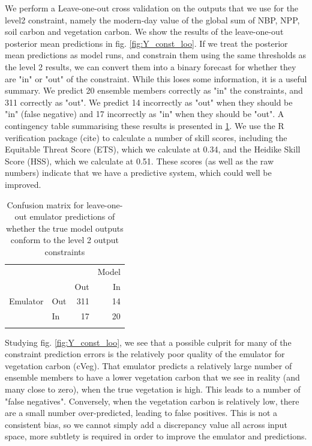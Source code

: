\documentclass[gmd, manuscript]{copernicus}
\begin{document}
We perform a Leave-one-out cross validation on the outputs that we use for the level2 constraint, namely the modern-day value of the global sum of NBP, NPP, soil carbon and vegetation carbon. We show the results of the leave-one-out posterior mean predictions in fig. \ref{fig:Y_const_loo}. If we treat the posterior mean predictions as model runs, and constrain them using the same thresholds as the level 2 results, we can convert them into a binary forecast for whether they are "in" or "out" of the constraint. While this loses some information, it is a useful summary. We predict 20 ensemble members correctly as "in" the constraints, and 311 correctly as "out". We predict 14 incorrectly as "out" when they should be "in" (false negative) and 17 incorrectly as "in" when they should be "out". A contingency table summarising these results is presented in \ref{table:level_2_contingency}. We use the R verification package (cite) to calculate a number of skill scores, including the Equitable Threat Score (ETS), which we calculate at 0.34, and the Heidike Skill Score (HSS), which we calculate at 0.51. These scores (as well as the raw numbers) indicate that we have a predictive system, which could well be improved.

\begin{table}[t]
\caption{Confusion matrix for leave-one-out emulator predictions of whether the true model outputs conform to the level 2 output constraints}
\label{table:level_2_contingency}
\begin{tabular}{l l r r}
\tophline
 &  &  & Model \\ 
& & Out &  In\\
Emulator & Out & 311 &  14 \\
 & In & 17 & 20 \\

\bottomhline
\end{tabular}
\belowtable{} %

\end{table}

Studying fig. \ref{fig:Y_const_loo}, we see that a possible culprit for many of the constraint prediction errors is the relatively poor quality of the emulator for vegetation carbon (cVeg). That emulator predicts a relatively large number of ensemble members to have a lower vegetation carbon that we see in reality (and many close to zero), when the true vegetation is high. This leads to a number of "false negatives". Conversely, when the vegetation carbon is relatively low, there are a small number over-predicted, leading to false positives. This is not a consistent bias, so we cannot simply add a discrepancy value all across input space, more subtlety is required in order to improve the emulator and predictions.
\end{document}
